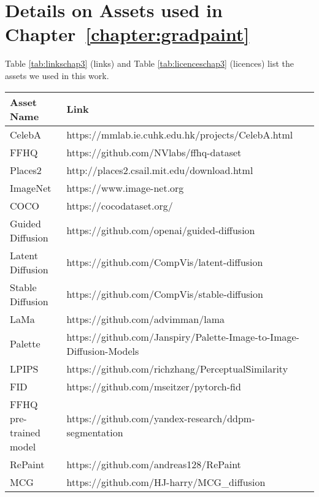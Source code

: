 \pagebreak

\section{Details on Assets used in Chapter~\ref{chapter:gradpaint}}
\label{sec:GradPaint assets}



Table \ref{tab:linkschap3} (links) and Table \ref{tab:licenceschap3} (licences)
list the assets we used in this work.

\begin{table*}[h]
\hspace{\sizeforappendix}
\footnotesize
\begin{tabular}{lll}
\toprule
\textbf{Asset Name} & \textbf{Link} \\
\midrule
CelebA & https://mmlab.ie.cuhk.edu.hk/projects/CelebA.html \\
FFHQ &  https://github.com/NVlabs/ffhq-dataset \\
Places2 &  http://places2.csail.mit.edu/download.html \\
ImageNet & https://www.image-net.org \\
COCO & https://cocodataset.org/ \\
Guided Diffusion & https://github.com/openai/guided-diffusion \\
Latent Diffusion & https://github.com/CompVis/latent-diffusion \\
Stable Diffusion & https://github.com/CompVis/stable-diffusion \\
LaMa & https://github.com/advimman/lama \\
Palette & https://github.com/Janspiry/Palette-Image-to-Image-Diffusion-Models \\
LPIPS &  https://github.com/richzhang/PerceptualSimilarity\\
FID & https://github.com/mseitzer/pytorch-fid \\ %
FFHQ pre-trained model & https://github.com/yandex-research/ddpm-segmentation \\ %
RePaint & https://github.com/andreas128/RePaint\\
MCG & https://github.com/HJ-harry/MCG\_diffusion\\
\bottomrule
\end{tabular}
\caption{List of asset links.}
\label{tab:linkschap3}
\end{table*}


